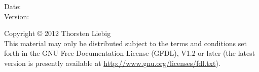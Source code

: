 \textbf{\displaytitle}

Date: \echodate \\
Version: \echoversion

Copyright © 2012 Thorsten Liebig\\
This material may only be distributed subject to the terms and conditions set forth in the GNU Free Documentation License (GFDL), V1.2 or later (the latest version is presently available at \url{http://www.gnu.org/licenses/fdl.txt}).
